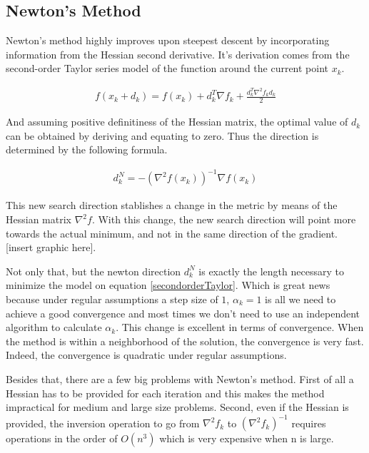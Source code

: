 \subsection{Newton's Method}

Newton's method highly improves upon steepest descent by incorporating information from the Hessian second derivative.  It's derivation comes from the second-order Taylor series model of the function around the current point $x_k$. 

\begin{equation} \label{secondorderTaylor}
  \begin{aligned}
    f(x_k + d_k) = f(x_k) + d_k^T \nabla f_k + \frac{d_k^T \nabla ^2 f_k d_k}{2}  
  \end{aligned}
\end{equation}

And assuming positive definitiness of the Hessian matrix, the optimal value of $d_k$ can be obtained by deriving and equating to zero. Thus the direction is determined by the following formula.

\begin{equation} \label{NewtonDir}
  \begin{aligned}
    d_k^N = -\left(\nabla^2 f(x_k) \right)^{-1} \nabla f(x_k)
  \end{aligned}
\end{equation}

This new search direction stablishes a change in the metric by means of the Hessian matrix $\nabla ^2 f$. With this change, the new search direction will point more towards the actual minimum, and not in the same direction of the gradient. [insert graphic here].

Not only that, but the newton direction $d_k^N$ is exactly the length necessary to minimize the model on equation \ref{secondorderTaylor}. Which is great news because under regular assumptions a step size of $1$, $\alpha_k = 1$ is all we need to achieve a good convergence and most times we don't need to use an independent algorithm to calculate $\alpha_k$. This change is excellent in terms of convergence. When the method is within a neighborhood of the solution, the convergence is very fast. Indeed, the convergence is quadratic under regular assumptions\citep{nocedal}.

Besides that, there are a few big problems with Newton's method. First of all a Hessian has to be provided for each iteration and this makes the method impractical for medium and large size problems. Second, even if the Hessian is provided, the inversion operation to go from $\nabla^2 f_k$ to $\left(\nabla^2 f_k \right)^{-1}$ requires operations in the order of $O(n^3)$ which is very expensive when n is large.


